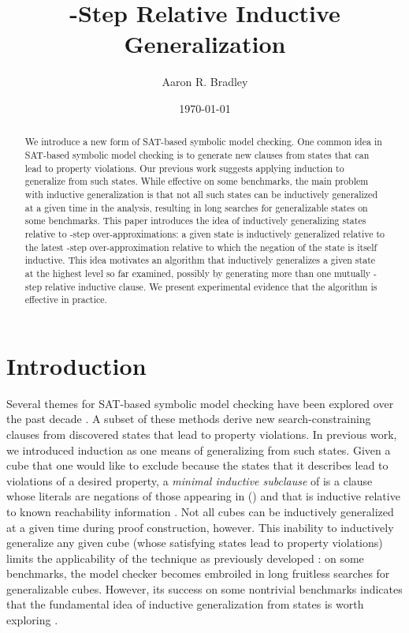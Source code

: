 \documentclass{llncs}
\title{-Step Relative Inductive Generalization}
\author{Aaron R. Bradley}
\institute{Dept. of Electrical, Computer \& Energy Engineering \\
University of Colorado at Boulder \\
Boulder, CO 80309 \\
{\tt bradleya@colorado.edu}
}
\date{\today}
\begin{document}
\maketitle
\begin{abstract}
We introduce a new form of SAT-based symbolic model checking.  One
common idea in SAT-based symbolic model checking is to generate new
clauses from states that can lead to property violations.  Our
previous work suggests applying induction to generalize from such
states.  While effective on some benchmarks, the main problem with
inductive generalization is that not all such states can be
inductively generalized at a given time in the analysis, resulting in
long searches for generalizable states on some benchmarks.  This paper
introduces the idea of inductively generalizing states relative to
-step over-approximations: a given state is inductively generalized
relative to the latest -step over-approximation relative to which
the negation of the state is itself inductive.  This idea motivates an
algorithm that inductively generalizes a given state at the highest
level  so far examined, possibly by generating more than one
mutually -step relative inductive clause.  We present experimental
evidence that the algorithm is effective in practice.
\end{abstract}

\newcommand{\vx}{\bar{x}}
\newcommand{\notmodels}[2]{#2 \not\models #1}
\newcommand{\mymodels}[2]{#2 \models #1}

\section{Introduction}

Several themes for SAT-based symbolic model checking
\cite{Burch+Others/1990} have been explored over the past decade
\cite{Biere+Others/1999,Sheeran+Others/2000,McMillan/2002,McMillan/2003,DeMoura+Others/2003,Bradley+Manna/2007}.
A subset of these methods
\cite{McMillan/2002,DeMoura+Others/2003,Bradley+Manna/2007} derive new
search-constraining clauses from discovered states that lead to
property violations.  In previous work, we introduced induction as one
means of generalizing from such states.  Given a cube  that one
would like to exclude because the states that it describes lead to
violations of a desired property, a \emph{minimal inductive subclause}
 of  is a clause whose literals are negations of those
appearing in  () and that is inductive
relative to known reachability information \cite{Bradley+Manna/2007}.
Not all cubes can be inductively generalized at a given time during
proof construction, however.  This inability to inductively generalize
any given cube (whose satisfying states lead to property violations)
limits the applicability of the technique as previously developed
\cite{Bradley+Manna/2007}: on some benchmarks, the model checker
becomes embroiled in long fruitless searches for generalizable cubes.
However, its success on some nontrivial benchmarks indicates that the
fundamental idea of inductive generalization from states is worth
exploring \cite{Bradley/2007}.
\end{document}

